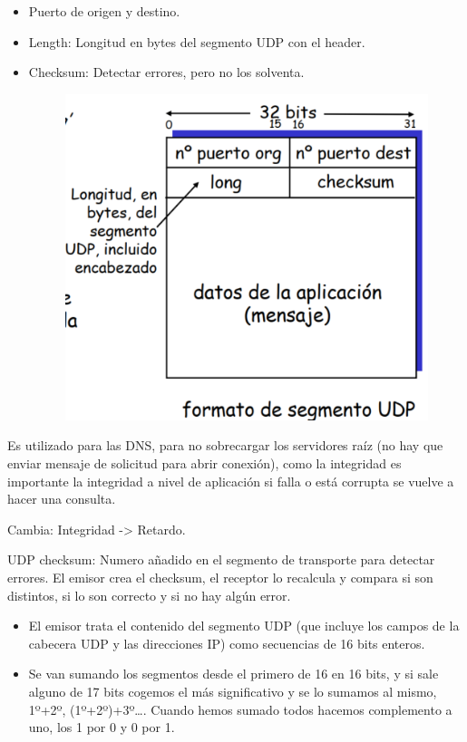 \documentclass[12pt, twoside, openright]{report} %
\begin{document}
\begin{itemize}
	\item Puerto de origen y destino.
	\item Length: Longitud en bytes del segmento UDP con el header.
	\item Checksum: Detectar errores, pero no los solventa.
	      \begin{figure}[H]
		      {\includegraphics[scale=.45]{Untitled 8.png}}
	      \end{figure}
\end{itemize}

Es utilizado para las DNS, para no sobrecargar los servidores raíz
(no hay que enviar mensaje de solicitud para abrir conexión), como
la integridad es importante la integridad a nivel de aplicación si
falla o está corrupta se vuelve a hacer una consulta.

Cambia: Integridad -\textgreater{} Retardo.

UDP checksum: Numero añadido en el segmento de transporte para
detectar errores. El emisor crea el checksum, el receptor lo
recalcula y compara si son distintos, si lo son correcto y si no hay
algún error.

\begin{itemize}
	\item El emisor trata el contenido del segmento UDP (que incluye los
	      campos de la cabecera UDP y las direcciones IP) como secuencias de
	      16 bits enteros.
	\item Se van sumando los segmentos desde el primero de 16 en 16 bits, y
	      si sale alguno de 17 bits cogemos el más significativo y se lo
	      sumamos al mismo, 1º+2º, (1º+2º)+3º\ldots. Cuando hemos sumado
	      todos hacemos complemento a uno, los 1 por 0 y 0 por 1.
\end{itemize}
\pagebreak
\end{document}
